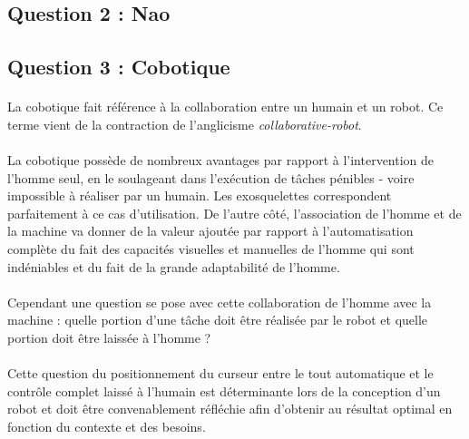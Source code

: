 \subsection{Question 2 : Nao}


\subsection{Question 3 : Cobotique}


\paragraph{}
La cobotique fait référence à la collaboration entre un humain et un robot.
Ce terme vient de la contraction de l'anglicisme \emph{collaborative-robot}.

\paragraph{}
La cobotique possède de nombreux avantages par rapport à l'intervention de
l'homme seul, en le soulageant dans l'exécution de tâches pénibles - voire
impossible à réaliser par un humain. Les exosquelettes correspondent
parfaitement à ce cas d'utilisation.
De l'autre côté, l'association de l'homme et de la machine va donner de la
valeur ajoutée par rapport à l'automatisation complète du fait des capacités
visuelles et manuelles de l'homme qui sont indéniables et du fait de la grande
adaptabilité de l'homme.

\paragraph{}
Cependant une question se pose avec cette collaboration de l'homme avec la
machine : quelle portion d'une tâche doit être réalisée par le robot et quelle
portion doit être laissée à l'homme ?

\paragraph{}
Cette question du positionnement du curseur entre le tout automatique et le
contrôle complet laissé à l'humain est déterminante lors de la conception d'un
robot et doit être convenablement réfléchie afin d'obtenir au résultat optimal
en fonction du contexte et des besoins.
